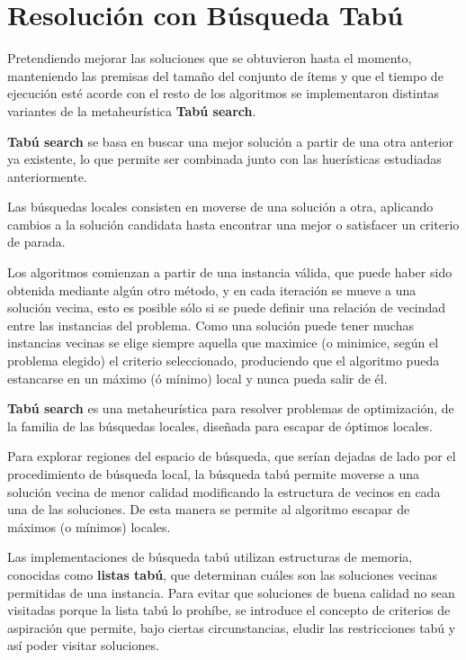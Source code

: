 \section{Resolución con Búsqueda Tabú}
Pretendiendo mejorar las soluciones que se obtuvieron hasta el momento, manteniendo las premisas del tamaño del conjunto de ítems y que el tiempo de ejecución esté acorde con el resto de los algoritmos se implementaron distintas variantes de la metaheurística \textbf{Tabú search}. 

\textbf{Tabú search} se basa en buscar una mejor solución a partir de una otra anterior ya existente, lo que permite ser combinada junto con las huerísticas estudiadas anteriormente.

Las búsquedas locales consisten en moverse de una solución a otra, aplicando cambios a la solución candidata hasta encontrar una mejor o satisfacer un criterio de parada. 

Los algoritmos comienzan a partir de una instancia válida, que puede haber sido obtenida mediante algún otro método, y en cada iteración se mueve a una solución vecina, esto es posible sólo si se puede definir una relación de vecindad entre las instancias del problema. Como una solución puede tener muchas instancias vecinas se elige siempre aquella que maximice (o minimice, según el problema elegido) el criterio seleccionado, produciendo que el algoritmo pueda estancarse en un máximo (ó mínimo) local y nunca pueda salir de él.

\textbf{Tabú search}\cite{TS-1,TS-2} es una metaheurística para resolver problemas de optimización, de la familia de las búsquedas locales, diseñada para escapar de óptimos locales. 

Para explorar regiones del espacio de búsqueda, que serían dejadas de lado por el procedimiento de búsqueda local, la búsqueda tabú permite moverse a una solución vecina de menor calidad modificando la estructura de vecinos en cada una de las soluciones. De esta manera se permite al algoritmo escapar de máximos (o mínimos) locales.

Las implementaciones de búsqueda tabú utilizan estructuras de memoria, conocidas como \textbf{listas tabú}, que determinan cuáles son las soluciones vecinas permitidas de una instancia. Para evitar que soluciones de buena calidad no sean visitadas porque la lista tabú lo prohíbe, se introduce el concepto de criterios de aspiración que permite, bajo ciertas circunstancias, eludir las restricciones tabú y así poder visitar soluciones.

